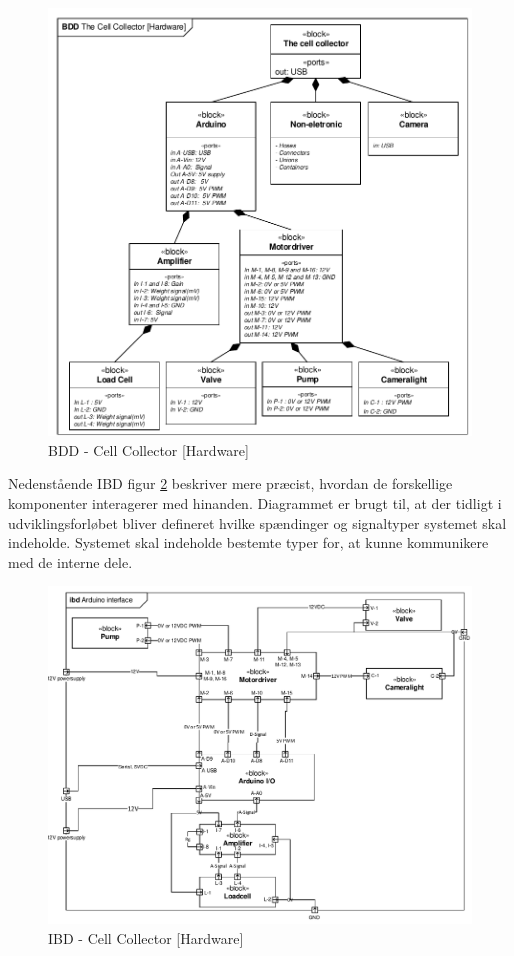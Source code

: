 \begin{figure}[H]
	\centering
	\includegraphics[width=1\textwidth]{pdf/BDD_Hardware.pdf}
	\caption{BDD - Cell Collector [Hardware]}
	\label{fig:bdd_Hardware}
\end{figure}

Nedenstående IBD figur \ref{fig:ibd_Hardware} beskriver mere præcist, hvordan de forskellige komponenter interagerer med hinanden. Diagrammet er brugt til, at der tidligt i udviklingsforløbet bliver defineret hvilke spændinger og signaltyper systemet skal indeholde. Systemet skal indeholde bestemte typer for, at kunne kommunikere med de interne dele.


\begin{figure}[H]
	\centering
	\includegraphics[width=1\textwidth]{pdf/IBD_Hardware(Arduino).pdf}
	\caption{IBD - Cell Collector [Hardware]}
	\label{fig:ibd_Hardware}
\end{figure}

